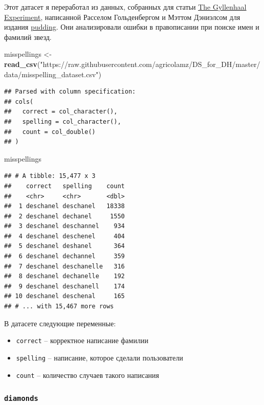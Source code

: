 \documentclass[]{book}
\newenvironment{Shaded}{\begin{snugshade}}{\end{snugshade}}
\newcommand{\KeywordTok}[1]{\textcolor[rgb]{0.13,0.29,0.53}{\textbf{#1}}}
\newcommand{\NormalTok}[1]{#1}
\newcommand{\StringTok}[1]{\textcolor[rgb]{0.31,0.60,0.02}{#1}}
\providecommand{\tightlist}{%
  \setlength{\itemsep}{0pt}\setlength{\parskip}{0pt}}
\begin{document}
Этот датасет я переработал из данных, собранных для статьи \href{https://pudding.cool/2019/02/gyllenhaal/}{The Gyllenhaal Experiment}, написанной Расселом Гольденбергом и Мэттом Дэниэлсом для издания \href{https://pudding.cool}{pudding}. Они анализировали ошибки в правописании при поиске имен и фамилий звезд.

\begin{Shaded}
\begin{Highlighting}[]
\NormalTok{misspellings <-}\StringTok{ }\KeywordTok{read_csv}\NormalTok{(}\StringTok{"https://raw.githubusercontent.com/agricolamz/DS_for_DH/master/data/misspelling_dataset.csv"}\NormalTok{)}
\end{Highlighting}
\end{Shaded}

\begin{verbatim}
## Parsed with column specification:
## cols(
##   correct = col_character(),
##   spelling = col_character(),
##   count = col_double()
## )
\end{verbatim}

\begin{Shaded}
\begin{Highlighting}[]
\NormalTok{misspellings}
\end{Highlighting}
\end{Shaded}

\begin{verbatim}
## # A tibble: 15,477 x 3
##    correct   spelling    count
##    <chr>     <chr>       <dbl>
##  1 deschanel deschanel   18338
##  2 deschanel dechanel     1550
##  3 deschanel deschannel    934
##  4 deschanel deschenel     404
##  5 deschanel deshanel      364
##  6 deschanel dechannel     359
##  7 deschanel deschanelle   316
##  8 deschanel dechanelle    192
##  9 deschanel deschanell    174
## 10 deschanel deschenal     165
## # ... with 15,467 more rows
\end{verbatim}

В датасете следующие переменные:

\begin{itemize}
\tightlist
\item
  \texttt{correct} -- корректное написание фамилии
\item
  \texttt{spelling} -- написание, которое сделали пользователи
\item
  \texttt{count} -- количество случаев такого написания
\end{itemize}

\hypertarget{diamonds}{%
\subsubsection{\texorpdfstring{\texttt{diamonds}}{diamonds}}\label{diamonds}}
\end{document}
